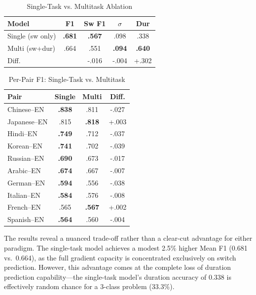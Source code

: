 \documentclass[sigconf,nonacm]{acmart}
\begin{document}
\begin{table}[h]
\centering
\small
\caption{Single-Task vs. Multitask Ablation}
\label{tab:ablation}
\begin{tabular}{lcccc}
\toprule
\textbf{Model} & \textbf{F1} & \textbf{Sw F1} & \textbf{$\sigma$} & \textbf{Dur} \\
\midrule
Single (sw only) & \textbf{.681} & \textbf{.567} & .098 & .338 \\
Multi (sw+dur) & .664 & .551 & \textbf{.094} & \textbf{.640} \\
\midrule
\multicolumn{2}{l}{Diff.} & -.016 & -.004 & +.302 \\
\bottomrule
\end{tabular}
\end{table}

\begin{table}[h]
\centering
\small
\caption{Per-Pair F1: Single-Task vs. Multitask}
\label{tab:ablation_perpair}
\begin{tabular}{lccc}
\toprule
\textbf{Pair} & \textbf{Single} & \textbf{Multi} & \textbf{Diff.} \\
\midrule
Chinese--EN & \textbf{.838} & .811 & -.027 \\
Japanese--EN & .815 & \textbf{.818} & +.003 \\
Hindi--EN & \textbf{.749} & .712 & -.037 \\
Korean--EN & \textbf{.741} & .702 & -.039 \\
Russian--EN & \textbf{.690} & .673 & -.017 \\
Arabic--EN & \textbf{.674} & .667 & -.007 \\
German--EN & \textbf{.594} & .556 & -.038 \\
Italian--EN & \textbf{.584} & .576 & -.008 \\
French--EN & .565 & \textbf{.567} & +.002 \\
Spanish--EN & \textbf{.564} & .560 & -.004 \\
\bottomrule
\end{tabular}
\end{table}

The results reveal a nuanced trade-off rather than a clear-cut advantage for either paradigm. The single-task model achieves a modest 2.5\% higher Mean F1 (0.681 vs.\ 0.664), as the full gradient capacity is concentrated exclusively on switch prediction. However, this advantage comes at the complete loss of duration prediction capability---the single-task model's duration accuracy of 0.338 is effectively random chance for a 3-class problem (33.3\%).
\end{document}
